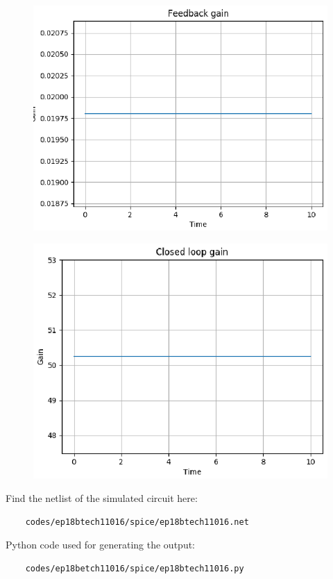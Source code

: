 \begin{enumerate}[label=\arabic*.,ref=\theenumi]
\begin{figure}[!ht]
    \centering
    \includegraphics[width=\columnwidth]{./figs/ep18btech11016/ep18btech11016_feed_gain.eps}
\caption{}
\label{fig:ep18btech11016_feed_gain}
\end{figure}

\begin{figure}[!ht]
	\centering
    \includegraphics[width=\columnwidth]{./figs/ep18btech11016/ep18btech11016_cl_gain.eps}
\caption{}
\label{fig:ep18btech11016_cl_gin}
\end{figure}
\renewcommand{\thefigure}{\theenumi}

Find the netlist of the simulated circuit here:
\begin{lstlisting}
    codes/ep18btech11016/spice/ep18btech11016.net
\end{lstlisting}

Python code used for generating the output:
\begin{lstlisting}
    codes/ep18betch11016/spice/ep18btech11016.py
\end{lstlisting}

\end{enumerate}
